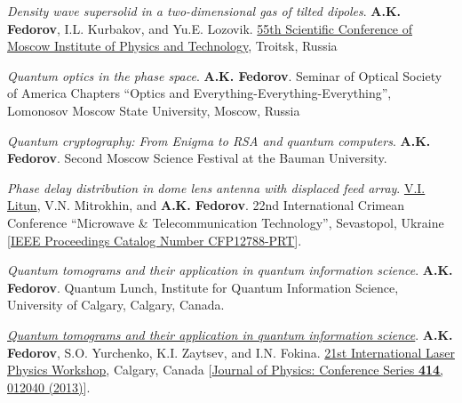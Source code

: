 \documentclass[10pt,a4paper,sans]{moderncv}
\begin{document}
	{\textit{Density wave supersolid in a two-dimensional gas of tilted dipoles}.
	\textbf{A.K. Fedorov}, I.L. Kurbakov, and Yu.E. Lozovik. 
	\textcolor{blue}{\href{http://mipt.ru/students/olympsaconfs/confmipt/f_5ykwxn/55conf//}{55th Scientific Conference of Moscow Institute of Physics and Technology}}, Troitsk, Russia}
	
	{\textit{Quantum optics in the phase space}.
	\textbf{A.K. Fedorov}.
	Seminar of Optical Society of America Chapters ``Optics and Everything-Everything-Everything'', 
	Lomonosov Moscow State University, Moscow, Russia}
	
	{\textit{Quantum cryptography: From Enigma to RSA and quantum computers}.
	\textbf{A.K. Fedorov}.
	Second Moscow Science Festival at the Bauman University.}
		
	{\textit{Phase delay distribution in dome lens antenna with displaced feed array}.
	\underline{V.I. Litun}, V.N. Mitrokhin, and \textbf{A.K. Fedorov}.
	22nd International Crimean Conference ``Microwave \& Telecommunication Technology'', Sevastopol, Ukraine
	[\textcolor{blue}{\href{http://ieeexplore.ieee.org/xpl/login.jsp?tp=&arnumber=6336056}{IEEE Proceedings Catalog Number CFP12788-PRT}}].}	
		
	{\textit{Quantum tomograms and their application in quantum information science}.
	\textbf{A.K. Fedorov}.
	Quantum Lunch, Institute for Quantum Information Science, University of Calgary, Calgary, Canada.}
	
	{\textit{\textcolor{blue}{\href{http://dx.doi.org/10.1088/1742-6596/414/1/012040}{Quantum tomograms and their application in quantum information science}}}.
	\textbf{A.K. Fedorov}, S.O. Yurchenko, K.I. Zaytsev, and I.N. Fokina.
	\textcolor{blue}{\href{http://www.lasphys.com/workshops/lasphys12/}{21st International Laser Physics Workshop}}, Calgary, Canada
	[\textcolor{blue}{\href{http://dx.doi.org/10.1088/1742-6596/414/1/012040}{Journal of Physics: Conference Series \textbf{414}, 012040 (2013)}}].}
	
\end{document}
